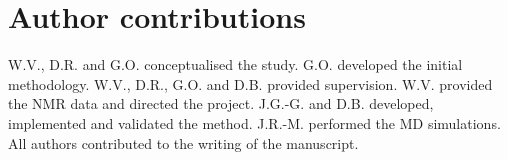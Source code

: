 
\section*{Author contributions}
W.V., D.R. and G.O. conceptualised the study.
G.O. developed the initial methodology.
W.V., D.R., G.O. and D.B. provided supervision.
W.V. provided the NMR data and directed the project.
J.G.-G. and D.B. developed, implemented and validated the method.
J.R.-M. performed the MD simulations.
All authors contributed to the writing of the manuscript.


